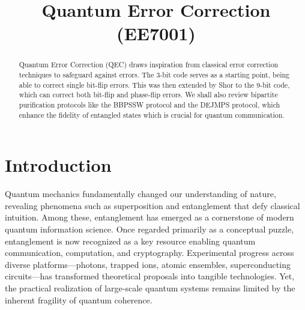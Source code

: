 \documentclass[conference]{IEEEtran}
\begin{document}
\title{Quantum Error Correction (EE7001)}

\author{
    \and
    \and
}

\maketitle

\begin{abstract}
    Quantum Error Correction (QEC) draws inspiration from classical error correction techniques to safeguard against errors. The 3-bit code serves as a starting point, being able to correct single bit-flip errors. This was then extended by Shor to the 9-bit code, which can correct both bit-flip and phase-flip errors. We shall also review bipartite purification protocols like the BBPSSW protocol and the DEJMPS protocol, which enhance the fidelity of entangled states which is crucial for quantum communication. 
\end{abstract}

\section{Introduction}
Quantum mechanics fundamentally changed our understanding of nature, revealing phenomena such as superposition and entanglement that defy classical intuition. Among these, entanglement has emerged as a cornerstone of modern quantum information science. Once regarded primarily as a conceptual puzzle, entanglement is now recognized as a key resource enabling quantum communication, computation, and cryptography. Experimental progress across diverse platforms—photons, trapped ions, atomic ensembles, superconducting circuits—has transformed theoretical proposals into tangible technologies. Yet, the practical realization of large-scale quantum systems remains limited by the inherent fragility of quantum coherence.
\end{document}
